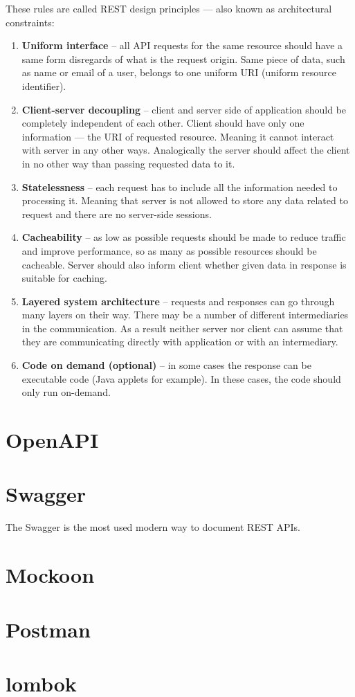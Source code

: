 These rules are called REST design principles --- also known as architectural constraints:
\cite{ibmrest}
\begin{enumerate}
    \item \textbf{Uniform interface} -- all API requests for the same resource should have a same form disregards of what is the request origin. Same piece of data, such as name or email of a user, belongs to one uniform URI (uniform resource identifier).
    \item \textbf{Client-server decoupling} -- client and server side of application should be completely independent of each other. Client should have only one information --- the URI of requested resource. Meaning it cannot interact with server in any other ways. Analogically the server should affect the client in no other way than passing requested data to it.
    \item \textbf{Statelessness} -- each request has to include all the information needed to processing it. Meaning that server is not allowed to store any data related to request and there are no server-side sessions.
    \item \textbf{Cacheability} -- as low as possible requests should be made to reduce traffic and improve performance, so as many as possible resources should be cacheable. Server should also inform client whether given data in response is suitable for caching.
    \item \textbf{Layered system architecture} -- requests and responses can go through many layers on their way. There may be a number of different intermediaries in the communication. As a result neither server nor client can assume that they are communicating directly with application or with an intermediary.
    \item \textbf{Code on demand (optional)} -- in some cases the response can be executable code (Java applets for example). In these cases, the code should only run on-demand.
\end{enumerate}

\section{OpenAPI} \label{sec:openapi}

\section{Swagger} \label{sec:swagger}
The Swagger is the most used modern way to document REST APIs.

\section{Mockoon}

\section{Postman}

\section{lombok}
